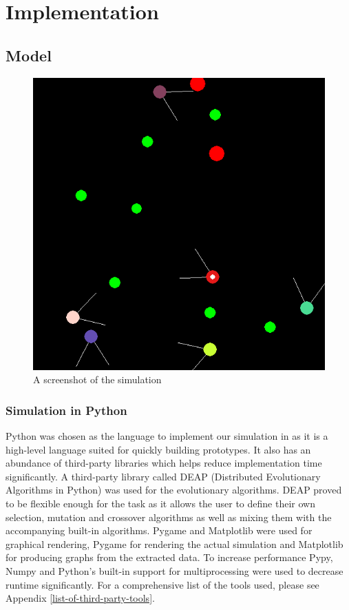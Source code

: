 \documentclass[a4paper,11pt]{kth-mag}
\begin{document}
\chapter{Implementation}
\section{Model}
\begin{figure}
\centering\includegraphics[scale=0.5]{simulation.png}
\caption{A screenshot of the simulation}
\end{figure}
\subsection{Simulation in Python}

Python was chosen as the language to implement our simulation in as it is a high-level language suited for quickly building prototypes. It also has an abundance of third-party libraries which helps reduce implementation time significantly. A third-party library called DEAP (Distributed Evolutionary Algorithms in Python) was used for the evolutionary algorithms. DEAP proved to be flexible enough for the task as it allows the user to define their own selection, mutation and crossover algorithms as well as mixing them with the accompanying built-in algorithms. Pygame and Matplotlib were used for graphical rendering, Pygame for rendering the actual simulation and Matplotlib for producing graphs from the extracted data. To increase performance Pypy, Numpy and Python's built-in support for multiprocessing were used to decrease runtime significantly. For a comprehensive list of the tools used, please see Appendix \ref{list-of-third-party-tools}.
\end{document}
